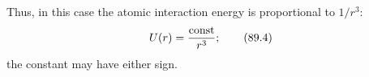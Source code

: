 Thus, in this case the atomic interaction energy is proportional to $1/r^3$:
\begin{equation}
U(r)=\frac{\mathop{\rm const}\nolimits}{r^3};
\tag{89.4}
\end{equation}
the constant may have either sign.
